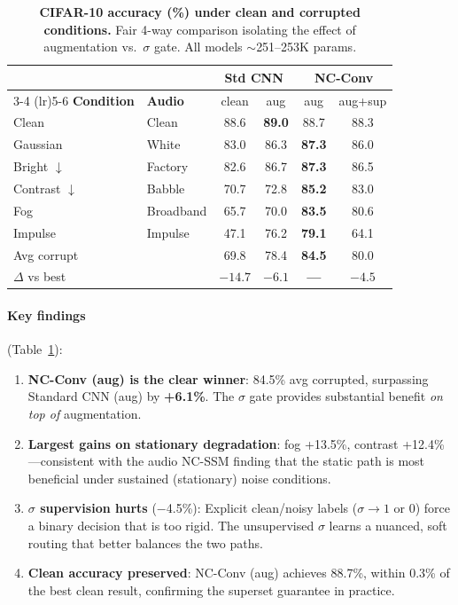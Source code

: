 \documentclass[10pt,twocolumn,letterpaper]{article}
\begin{document}
\begin{table}[t]
\centering
\caption{\textbf{CIFAR-10 accuracy (\%) under clean and corrupted conditions.} Fair 4-way comparison isolating the effect of augmentation vs.\ $\sigma$ gate. All models $\sim$251--253K params.}
\label{tab:cifar10}
\setlength{\tabcolsep}{2.5pt}
\footnotesize
\begin{tabular}{@{}ll cccc@{}}
\toprule
& & \multicolumn{2}{c}{\textbf{Std CNN}} & \multicolumn{2}{c}{\textbf{NC-Conv}} \\
\cmidrule(lr){3-4} \cmidrule(lr){5-6}
\textbf{Condition} & \textbf{Audio} & clean & aug & aug & aug+sup \\
\midrule
Clean & Clean & 88.6 & \textbf{89.0} & 88.7 & 88.3 \\
\midrule
Gaussian & White & 83.0 & 86.3 & \textbf{87.3} & 86.0 \\
Bright $\downarrow$ & Factory & 82.6 & 86.7 & \textbf{87.3} & 86.5 \\
Contrast $\downarrow$ & Babble & 70.7 & 72.8 & \textbf{85.2} & 83.0 \\
Fog & Broadband & 65.7 & 70.0 & \textbf{83.5} & 80.6 \\
Impulse & Impulse & 47.1 & 76.2 & \textbf{79.1} & 64.1 \\
\midrule
Avg corrupt & & 69.8 & 78.4 & \textbf{84.5} & 80.0 \\
\midrule
$\Delta$ vs best & & $-14.7$ & $-6.1$ & \textbf{---} & $-4.5$ \\
\bottomrule
\end{tabular}
\end{table}

\paragraph{Key findings} (Table~\ref{tab:cifar10}):
\begin{enumerate}
\setlength\itemsep{0pt}
\item \textbf{NC-Conv (aug) is the clear winner}: 84.5\% avg corrupted, surpassing Standard CNN (aug) by \textbf{+6.1\%}. The $\sigma$ gate provides substantial benefit \emph{on top of} augmentation.
\item \textbf{Largest gains on stationary degradation}: fog +13.5\%, contrast +12.4\%---consistent with the audio NC-SSM finding that the static path is most beneficial under sustained (stationary) noise conditions.
\item \textbf{$\sigma$ supervision hurts} ($-$4.5\%): Explicit clean/noisy labels ($\sigma \to 1$ or $0$) force a binary decision that is too rigid. The unsupervised $\sigma$ learns a nuanced, soft routing that better balances the two paths.
\item \textbf{Clean accuracy preserved}: NC-Conv (aug) achieves 88.7\%, within 0.3\% of the best clean result, confirming the superset guarantee in practice.
\end{enumerate}
\end{document}

